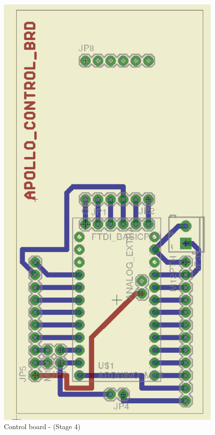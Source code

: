 \documentclass[12pt,a4paper,draft]{report}
\begin{document}
\begin{figure}[H]
\centering
\includegraphics*[scale=0.25]{control_brd_s4}
\caption{Control board -  (Stage 4)}
\label{Control-brd-s4}
\end{figure}
\ \\
\end{document}
